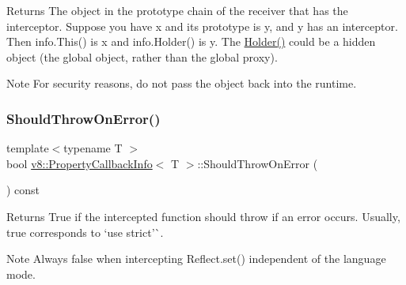 \begin{DoxyReturn}{Returns}
The object in the prototype chain of the receiver that has the interceptor. Suppose you have {\ttfamily x} and its prototype is {\ttfamily y}, and {\ttfamily y} has an interceptor. Then {\ttfamily info.\+This()} is {\ttfamily x} and {\ttfamily info.\+Holder()} is {\ttfamily y}. The \mbox{\hyperlink{classv8_1_1PropertyCallbackInfo_a66b7ec267f18bd84e8baf0a0e16187b9}{Holder()}} could be a hidden object (the global object, rather than the global proxy).
\end{DoxyReturn}
\begin{DoxyNote}{Note}
For security reasons, do not pass the object back into the runtime. 
\end{DoxyNote}
\mbox{\label{classv8_1_1PropertyCallbackInfo_a82d79a9cdaac9807a0fa17331b159ce9}} 
\subsubsection{\texorpdfstring{Should\+Throw\+On\+Error()}{ShouldThrowOnError()}}
{\footnotesize\ttfamily template$<$typename T $>$ \\
bool \mbox{\hyperlink{classv8_1_1PropertyCallbackInfo}{v8\+::\+Property\+Callback\+Info}}$<$ T $>$\+::Should\+Throw\+On\+Error (\begin{DoxyParamCaption}{ }\end{DoxyParamCaption}) const}

\begin{DoxyReturn}{Returns}
True if the intercepted function should throw if an error occurs. Usually, {\ttfamily true} corresponds to `\textquotesingle{}use strict'\`{}.
\end{DoxyReturn}
\begin{DoxyNote}{Note}
Always {\ttfamily false} when intercepting {\ttfamily Reflect.\+set()} independent of the language mode. 
\end{DoxyNote}
\mbox{\label{classv8_1_1PropertyCallbackInfo_af46300339d2f31d8dc84a06d74ed6c3c}} 
